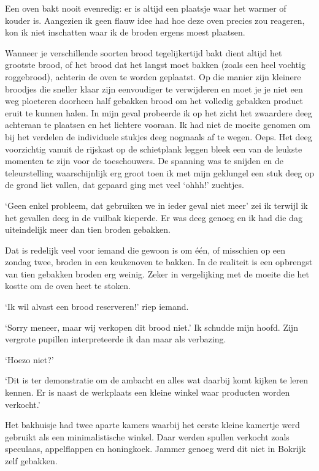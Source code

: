 \documentclass[
  11pt,
  dutch,
]{memoir}
\begin{document}
Een oven bakt nooit evenredig: er is altijd een plaatsje waar het warmer
of kouder is. Aangezien ik geen flauw idee had hoe deze oven precies zou
reageren, kon ik niet inschatten waar ik de broden ergens moest
plaatsen.

Wanneer je verschillende soorten brood tegelijkertijd bakt dient altijd
het grootste brood, of het brood dat het langst moet bakken (zoals een
heel vochtig roggebrood), achterin de oven te worden geplaatst. Op die
manier zijn kleinere broodjes die sneller klaar zijn eenvoudiger te
verwijderen en moet je je niet een weg ploeteren doorheen half gebakken
brood om het volledig gebakken product eruit te kunnen halen. In mijn
geval probeerde ik op het zicht het zwaardere deeg achteraan te plaatsen
en het lichtere vooraan. Ik had niet de moeite genomen om bij het
verdelen de individuele stukjes deeg nogmaals af te wegen. Oeps. Het
deeg voorzichtig vanuit de rijskast op de schietplank leggen bleek een
van de leukste momenten te zijn voor de toeschouwers. De spanning was te
snijden en de teleurstelling waarschijnlijk erg groot toen ik met mijn
geklungel een stuk deeg op de grond liet vallen, dat gepaard ging met
veel `ohhh!' zuchtjes.

`Geen enkel probleem, dat gebruiken we in ieder geval niet meer' zei ik
terwijl ik het gevallen deeg in de vuilbak kieperde. Er was deeg genoeg
en ik had die dag uiteindelijk meer dan tien broden gebakken.

Dat is redelijk veel voor iemand die gewoon is om één, of misschien op
een zondag twee, broden in een keukenoven te bakken. In de realiteit is
een opbrengst van tien gebakken broden erg weinig. Zeker in vergelijking
met de moeite die het kostte om de oven heet te stoken.

`Ik wil alvast een brood reserveren!' riep iemand.

`Sorry meneer, maar wij verkopen dit brood niet.' Ik schudde mijn hoofd.
Zijn vergrote pupillen interpreteerde ik dan maar als verbazing.

`Hoezo niet?'

`Dit is ter demonstratie om de ambacht en alles wat daarbij komt kijken
te leren kennen. Er is naast de werkplaats een kleine winkel waar
producten worden verkocht.'

Het bakhuisje had twee aparte kamers waarbij het eerste kleine kamertje
werd gebruikt als een minimalistische winkel. Daar werden spullen
verkocht zoals speculaas, appelflappen en honingkoek. Jammer genoeg werd
dit niet in Bokrijk zelf gebakken.
\end{document}
